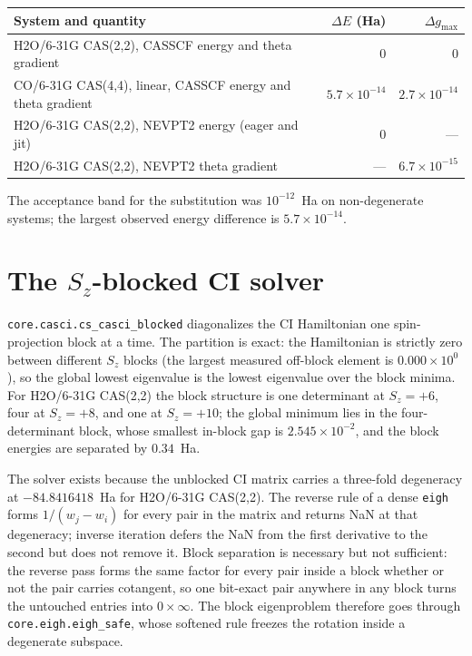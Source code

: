 \begin{center}
\begin{tabular}{lrr}
\toprule
System and quantity & $\Delta E$ (Ha) & $\Delta g_{\max}$ \\
\midrule
H2O/6-31G CAS(2,2), CASSCF energy and theta gradient & $0$ & $0$ \\
CO/6-31G CAS(4,4), linear, CASSCF energy and theta gradient
  & $5.7\times10^{-14}$ & $2.7\times10^{-14}$ \\
H2O/6-31G CAS(2,2), NEVPT2 energy (eager and jit) & $0$ & --- \\
H2O/6-31G CAS(2,2), NEVPT2 theta gradient & --- & $6.7\times10^{-15}$ \\
\bottomrule
\end{tabular}
\end{center}

The acceptance band for the substitution was $10^{-12}$~Ha on
non-degenerate systems; the largest observed energy difference is
$5.7\times10^{-14}$.

\section{The $S_z$-blocked CI solver}

\texttt{core.casci.cs\_casci\_blocked} diagonalizes the CI Hamiltonian
one spin-projection block at a time.  The partition is exact: the
Hamiltonian is strictly zero between different $S_z$ blocks (the
largest measured off-block element is $0.000\times10^{0}$), so the
global lowest eigenvalue is the lowest eigenvalue over the block
minima.  For H2O/6-31G CAS(2,2) the block structure is one determinant
at $S_z = +6$, four at $S_z = +8$, and one at $S_z = +10$; the global
minimum lies in the four-determinant block, whose smallest in-block
gap is $2.545\times10^{-2}$, and the block energies are separated by
$0.34$~Ha.

The solver exists because the unblocked CI matrix carries a three-fold
degeneracy at $-84.8416418$~Ha for H2O/6-31G CAS(2,2).  The reverse
rule of a dense \texttt{eigh} forms $1/(w_j-w_i)$ for every pair in the
matrix and returns NaN at that degeneracy; inverse iteration defers
the NaN from the first derivative to the second but does not remove it.
Block separation is necessary but not sufficient: the reverse pass
forms the same factor for every pair inside a block whether or not the
pair carries cotangent, so one bit-exact pair anywhere in any block
turns the untouched entries into $0 \times \infty$.  The block
eigenproblem therefore goes through \texttt{core.eigh.eigh\_safe},
whose softened rule freezes the rotation inside a degenerate subspace.

